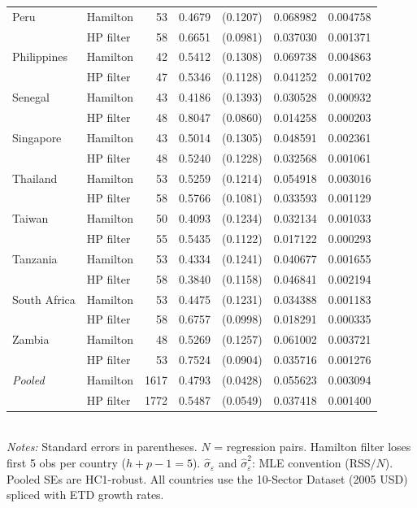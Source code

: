 \begin{table}[htbp]
\begin{tabular}{llrcccc}
    Peru & Hamilton & 53 & 0.4679 & (0.1207) & 0.068982 & 0.004758 \\
    & HP filter & 58 & 0.6651 & (0.0981) & 0.037030 & 0.001371 \\[3pt]
    Philippines & Hamilton & 42 & 0.5412 & (0.1308) & 0.069738 & 0.004863 \\
    & HP filter & 47 & 0.5346 & (0.1128) & 0.041252 & 0.001702 \\[3pt]
    Senegal & Hamilton & 43 & 0.4186 & (0.1393) & 0.030528 & 0.000932 \\
    & HP filter & 48 & 0.8047 & (0.0860) & 0.014258 & 0.000203 \\[3pt]
    Singapore & Hamilton & 43 & 0.5014 & (0.1305) & 0.048591 & 0.002361 \\
    & HP filter & 48 & 0.5240 & (0.1228) & 0.032568 & 0.001061 \\[3pt]
    Thailand & Hamilton & 53 & 0.5259 & (0.1214) & 0.054918 & 0.003016 \\
    & HP filter & 58 & 0.5766 & (0.1081) & 0.033593 & 0.001129 \\[3pt]
    Taiwan & Hamilton & 50 & 0.4093 & (0.1234) & 0.032134 & 0.001033 \\
    & HP filter & 55 & 0.5435 & (0.1122) & 0.017122 & 0.000293 \\[3pt]
    Tanzania & Hamilton & 53 & 0.4334 & (0.1241) & 0.040677 & 0.001655 \\
    & HP filter & 58 & 0.3840 & (0.1158) & 0.046841 & 0.002194 \\[3pt]
    South Africa & Hamilton & 53 & 0.4475 & (0.1231) & 0.034388 & 0.001183 \\
    & HP filter & 58 & 0.6757 & (0.0998) & 0.018291 & 0.000335 \\[3pt]
    Zambia & Hamilton & 48 & 0.5269 & (0.1257) & 0.061002 & 0.003721 \\
    & HP filter & 53 & 0.7524 & (0.0904) & 0.035716 & 0.001276 \\[3pt]
    \midrule
    {\itshape Pooled} & Hamilton & 1617 & 0.4793 & (0.0428) & 0.055623 & 0.003094 \\
    & HP filter & 1772 & 0.5487 & (0.0549) & 0.037418 & 0.001400 \\
    \bottomrule
  \end{tabular}
  \\[4pt]
  \footnotesize\textit{Notes:} Standard errors in parentheses. $N$ = regression pairs. Hamilton filter loses first 5 obs per country ($h+p-1=5$). $\hat{\sigma}_{\varepsilon}$ and $\hat{\sigma}^2_{\varepsilon}$: MLE convention (RSS$/N$). Pooled SEs are HC1-robust. All countries use the 10-Sector Dataset (2005 USD) spliced with ETD growth rates.
\end{table}
